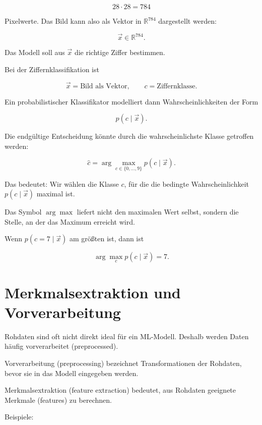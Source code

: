 \[
    28 \cdot 28 = 784
\]

Pixelwerte.
Das Bild kann also als Vektor in \(\mathbb{R}^{784}\) dargestellt werden:

\[
    \vec{x} \in \mathbb{R}^{784}.
\]

Das Modell soll aus \(\vec{x}\) die richtige Ziffer bestimmen.

\begin{definitionbox}
Bei der Ziffernklassifikation ist

\[
    \vec{x} = \text{Bild als Vektor},
    \qquad
    c = \text{Ziffernklasse}.
\]

Ein probabilistischer Klassifikator modelliert dann Wahrscheinlichkeiten der Form

\[
    p(c \mid \vec{x}).
\]
\end{definitionbox}

Die endgültige Entscheidung könnte durch die wahrscheinlichste Klasse getroffen werden:

\[
    \hat{c}
    =
    \arg\max_{c \in \{0,\dots,9\}}
    p(c \mid \vec{x}).
\]

Das bedeutet:
Wir wählen die Klasse \(c\), für die die bedingte Wahrscheinlichkeit \(p(c \mid \vec{x})\) maximal ist.

\begin{notebox}
Das Symbol \(\arg\max\) liefert nicht den maximalen Wert selbst, sondern die Stelle, an der das Maximum erreicht wird.

Wenn \(p(c=7 \mid \vec{x})\) am größten ist, dann ist

\[
    \arg\max_c p(c \mid \vec{x}) = 7.
\]
\end{notebox}

\section{Merkmalsextraktion und Vorverarbeitung}

Rohdaten sind oft nicht direkt ideal für ein ML-Modell.
Deshalb werden Daten häufig vorverarbeitet (preprocessed).

\begin{definitionbox}
Vorverarbeitung (preprocessing) bezeichnet Transformationen der Rohdaten, bevor sie in das Modell eingegeben werden.

Merkmalsextraktion (feature extraction) bedeutet, aus Rohdaten geeignete Merkmale (features) zu berechnen.
\end{definitionbox}

Beispiele:

